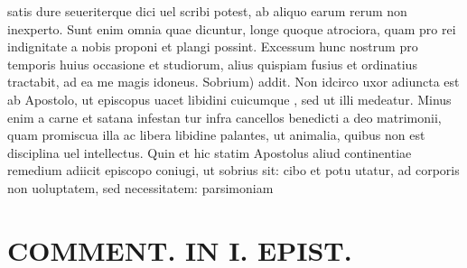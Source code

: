 \documentclass{article}
\begin{document}
\begin{pages}
satis dure seueriterque dici uel scribi potest, ab aliquo earum rerum non inexperto. Sunt enim omnia quae dicuntur, longe quoque atrociora, quam pro rei indignitate a nobis proponi et plangi possint. Excessum hunc nostrum pro temporis huius occasione et studiorum, alius quispiam fusius et ordinatius tractabit, ad ea me magis idoneus. Sobrium) addit. Non idcirco uxor adiuncta est ab Apostolo, ut episcopus uacet libidini cuicumque , sed ut illi medeatur. Minus enim a carne et satana infestan tur infra cancellos benedicti a deo matrimonii, quam promiscua illa ac libera libidine palantes, ut animalia, quibus non est disciplina uel intellectus. Quin et hic statim Apostolus aliud continentiae remedium adiicit episcopo coniugi, ut sobrius sit: cibo et potu utatur, ad corporis non uoluptatem, sed necessitatem: parsimoniam  \pend
\section*{COMMENT. IN I. EPIST. }

\end{pages}
\end{document}
